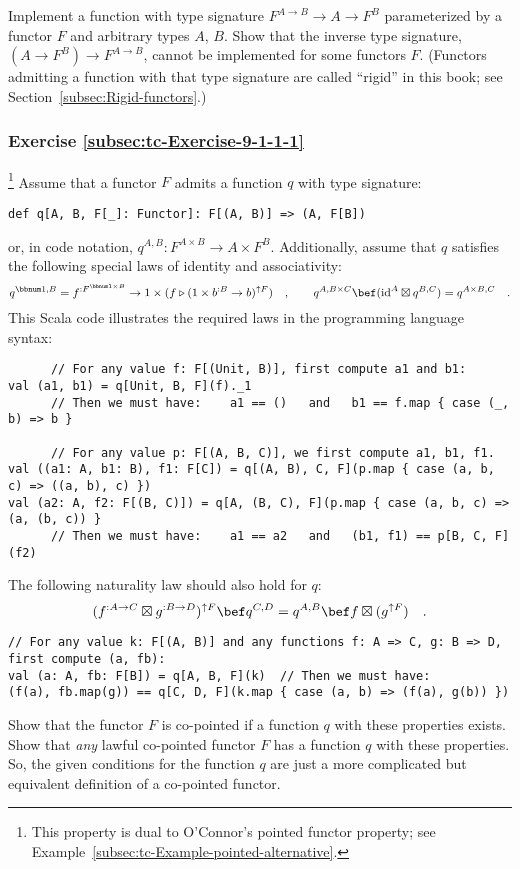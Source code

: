 Implement a function with type signature $F^{A\rightarrow B}\rightarrow A\rightarrow F^{B}$
parameterized by a functor $F$ and arbitrary types $A$, $B$. Show
that the inverse type signature, $(A\rightarrow F^{B})\rightarrow F^{A\rightarrow B}$,
cannot be implemented for some functors $F$. (Functors admitting
a function with that type signature are called \textsf{``}rigid\textsf{''}
in this book; see Section~\ref{subsec:Rigid-functors}.)

\subsubsection{Exercise \label{subsec:tc-Exercise-9-1-1-1}\ref{subsec:tc-Exercise-9-1-1-1}}

\footnote{This property is dual to O\textsf{'}Connor\textsf{'}s pointed functor property; see
Example~\ref{subsec:tc-Example-pointed-alternative}.} Assume that a functor $F$ admits a function
$q$ with type signature:
\begin{lstlisting}
def q[A, B, F[_]: Functor]: F[(A, B)] => (A, F[B])
\end{lstlisting}
or, in code notation, $q^{A,B}:F^{A\times B}\rightarrow A\times F^{B}$.
Additionally, assume that $q$ satisfies the following special laws
of identity and associativity:
\[
q^{\bbnum 1,B}=f^{:F^{\bbnum 1\times B}}\rightarrow1\times(f\triangleright(1\times b^{:B}\rightarrow b)^{\uparrow F})\quad,\quad\quad q^{A,B\times C}\bef(\text{id}^{A}\boxtimes q^{B,C})=q^{A\times B,C}\quad.
\]
This Scala code illustrates the required laws in the programming language
syntax:
\begin{lstlisting}
      // For any value f: F[(Unit, B)], first compute a1 and b1:
val (a1, b1) = q[Unit, B, F](f)._1
      // Then we must have:    a1 == ()   and   b1 == f.map { case (_, b) => b }

      // For any value p: F[(A, B, C)], we first compute a1, b1, f1.
val ((a1: A, b1: B), f1: F[C]) = q[(A, B), C, F](p.map { case (a, b, c) => ((a, b), c) })
val (a2: A, f2: F[(B, C)]) = q[A, (B, C), F](p.map { case (a, b, c) => (a, (b, c)) }
      // Then we must have:    a1 == a2   and   (b1, f1) == p[B, C, F](f2)
\end{lstlisting}
The following naturality law should also hold for $q$:
\[
(f^{:A\rightarrow C}\boxtimes g^{:B\rightarrow D})^{\uparrow F}\bef q^{C,D}=q^{A,B}\bef f\boxtimes(g^{\uparrow F})\quad.
\]
\begin{lstlisting}
// For any value k: F[(A, B)] and any functions f: A => C, g: B => D, first compute (a, fb):
val (a: A, fb: F[B]) = q[A, B, F](k)  // Then we must have:
(f(a), fb.map(g)) == q[C, D, F](k.map { case (a, b) => (f(a), g(b)) })
\end{lstlisting}
Show that the functor $F$ is co-pointed if a function $q$ with these
properties exists. Show that \emph{any} lawful co-pointed functor
$F$ has a function $q$ with these properties. So, the given conditions
for the function $q$ are just a more complicated but equivalent definition
of a co-pointed functor.

